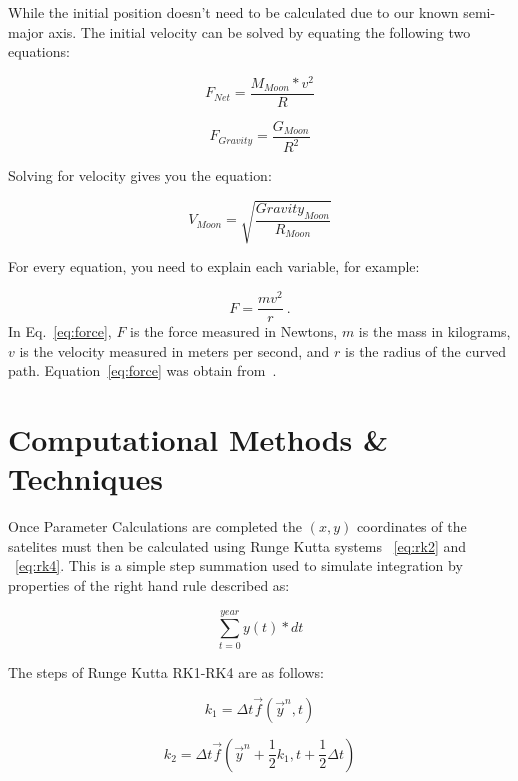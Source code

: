 \documentclass[11pt]{article}
\begin{document}
\noindent While the initial position doesn't need to be calculated due to our known semi-major axis. The initial velocity can be solved by equating the following two equations:

\begin{equation}
\label{eq:netForce}
 F_{Net}=\frac{M_{Moon}*v^{2}}{R}
\end{equation}

\begin{equation}
\label{eq:gravForce}
 F_{Gravity}=\frac{G_{Moon}}{R^{2}}
\end{equation}

\noindent Solving for velocity gives you the equation:

\begin{equation}
\label{eq:velocity}
V_{Moon} = \sqrt{\frac{Gravity_{Moon}}{R_{Moon}}}
\end{equation}

\noindent For every equation, you need to explain each variable, for example:

\begin{equation}
\label{eq:force}
F=\dfrac{mv^2}{r}~.
\end{equation}
\noindent In Eq.~\eqref{eq:force}, $F$ is the force measured in Newtons, $m$ is the
mass in kilograms, $v$ is the velocity measured in meters per second, and $r$ is
the radius of the curved path.  Equation~\eqref{eq:force} was obtain from~\cite{uni}.

\section{Computational Methods \& Techniques}
\noindent Once Parameter Calculations are completed the $(x, y)$ coordinates of the satelites must then be calculated using Runge Kutta systems ~\eqref{eq:rk2} and ~\eqref{eq:rk4}. This is a simple step summation used to simulate integration by properties of the right hand rule described as:

\begin{equation}
\label{eq:rhr}
\sum_{t=0}^{year}y(t)*dt
\end{equation}

\noindent The steps of Runge Kutta RK1-RK4 are as follows:

\begin{equation}
\label{eq:rk1}
k_{1}= \Delta t\vec{f}(\vec{y}^{n},t)
\end{equation}

\begin{equation}
\label{eq:rk2}
k_{2}= \Delta t\vec{f}(\vec{y}^{n} + \frac{1}{2}k_{1},t + \frac{1}{2}\Delta t)
\end{equation}
\end{document}
